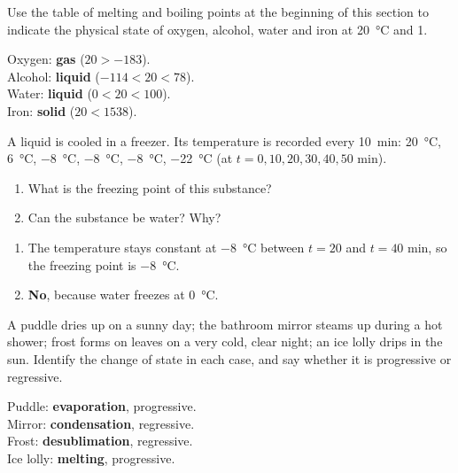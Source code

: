 \begin{exercise}
    Use the table of melting and boiling points at the beginning of this section to indicate the physical state of oxygen, alcohol, water and iron at \qty{20}{\celsius} and \qty{1}{\atmospher}.
    \begin{solu}
        Oxygen: \textbf{gas} (\(20 > -183\)). \\
        Alcohol: \textbf{liquid} (\(-114 < 20 < 78\)). \\
        Water: \textbf{liquid} (\(0 < 20 < 100\)). \\
        Iron: \textbf{solid} (\(20 < 1538\)).
    \end{solu}
\end{exercise}

\begin{exercise}
    A liquid is cooled in a freezer. Its temperature is recorded every \qty{10}{\minute}: \qty{20}{\celsius}, \qty{6}{\celsius}, \qty{-8}{\celsius}, \qty{-8}{\celsius}, \qty{-8}{\celsius}, \qty{-22}{\celsius} (at \(t = 0, 10, 20, 30, 40, 50\) min).
    \begin{enumerate}[label=\letraminuscula]
        \item What is the freezing point of this substance?
        \item Can the substance be water? Why?
    \end{enumerate}
    \begin{solu}
        \begin{enumerate}[label=\alph*)]
            \item The temperature stays constant at \qty{-8}{\celsius} between \(t = 20\) and \(t = 40\) min, so the freezing point is \qty{-8}{\celsius}.
            \item \textbf{No}, because water freezes at \qty{0}{\celsius}.
        \end{enumerate}
    \end{solu}
\end{exercise}

\begin{exercise}
    A puddle dries up on a sunny day; the bathroom mirror steams up during a hot shower; frost forms on leaves on a very cold, clear night; an ice lolly drips in the sun. Identify the change of state in each case, and say whether it is progressive or regressive.
    \begin{solu}
        Puddle: \textbf{evaporation}, progressive. \\
        Mirror: \textbf{condensation}, regressive. \\
        Frost: \textbf{desublimation}, regressive. \\
        Ice lolly: \textbf{melting}, progressive.
    \end{solu}
\end{exercise}

